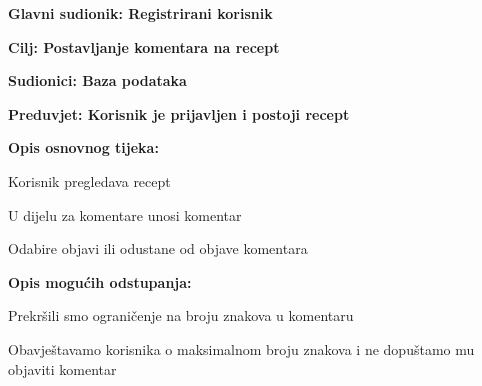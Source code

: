 	
	\noindent {}
	\begin{packed_item}
		
		\item \textbf{Glavni sudionik: Registrirani korisnik}
		\item  \textbf{Cilj: Postavljanje komentara na recept} 
		\item  \textbf{Sudionici: Baza podataka} 
		\item  \textbf{Preduvjet: Korisnik je prijavljen i postoji recept} 
		\item  \textbf{Opis osnovnog tijeka:}
		
		\item[] \begin{packed_enum}
			
			\item Korisnik pregledava recept
			\item U dijelu za komentare unosi komentar 
			\item Odabire objavi ili odustane od objave komentara
		\end{packed_enum}
		
		\item  \textbf{Opis mogućih odstupanja:}
		
		\item[] \begin{packed_item}
			
			\item[2.a] Prekršili smo ograničenje na broju znakova u komentaru
			\item[] \begin{packed_enum}
				
				\item Obavještavamo korisnika o maksimalnom broju znakova i ne dopuštamo mu objaviti komentar 
			\end{packed_enum}
			
			
		\end{packed_item}
	\end{packed_item}
	
